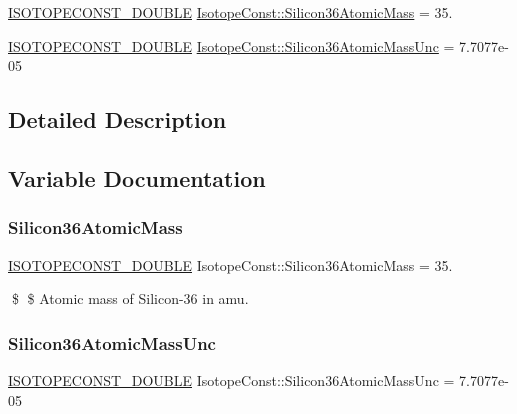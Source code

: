 \begin{DoxyCompactItemize}
\item 
\mbox{\hyperlink{group___isotope_const-_macros_ga8f45a7272ce02c0b4c65c44636ed719a}{I\+S\+O\+T\+O\+P\+E\+C\+O\+N\+S\+T\+\_\+\+D\+O\+U\+B\+LE}} \mbox{\hyperlink{group___isotope_const-_silicon-_si36_ga87ded2e4021682e470233b293ed8ca87}{Isotope\+Const\+::\+Silicon36\+Atomic\+Mass}} = 35.
\item 
\mbox{\hyperlink{group___isotope_const-_macros_ga8f45a7272ce02c0b4c65c44636ed719a}{I\+S\+O\+T\+O\+P\+E\+C\+O\+N\+S\+T\+\_\+\+D\+O\+U\+B\+LE}} \mbox{\hyperlink{group___isotope_const-_silicon-_si36_gafc7938cbdfd38362592f2996803cdbca}{Isotope\+Const\+::\+Silicon36\+Atomic\+Mass\+Unc}} = 7.\+7077e-\/05
\end{DoxyCompactItemize}


\subsection{Detailed Description}


\subsection{Variable Documentation}
\mbox{\label{group___isotope_const-_silicon-_si36_ga87ded2e4021682e470233b293ed8ca87}} 
\subsubsection{\texorpdfstring{Silicon36\+Atomic\+Mass}{Silicon36AtomicMass}}
{\footnotesize\ttfamily \mbox{\hyperlink{group___isotope_const-_macros_ga8f45a7272ce02c0b4c65c44636ed719a}{I\+S\+O\+T\+O\+P\+E\+C\+O\+N\+S\+T\+\_\+\+D\+O\+U\+B\+LE}} Isotope\+Const\+::\+Silicon36\+Atomic\+Mass = 35.}

\$ \$ Atomic mass of Silicon-\/36 in amu. \mbox{\label{group___isotope_const-_silicon-_si36_gafc7938cbdfd38362592f2996803cdbca}} 
\subsubsection{\texorpdfstring{Silicon36\+Atomic\+Mass\+Unc}{Silicon36AtomicMassUnc}}
{\footnotesize\ttfamily \mbox{\hyperlink{group___isotope_const-_macros_ga8f45a7272ce02c0b4c65c44636ed719a}{I\+S\+O\+T\+O\+P\+E\+C\+O\+N\+S\+T\+\_\+\+D\+O\+U\+B\+LE}} Isotope\+Const\+::\+Silicon36\+Atomic\+Mass\+Unc = 7.\+7077e-\/05}

